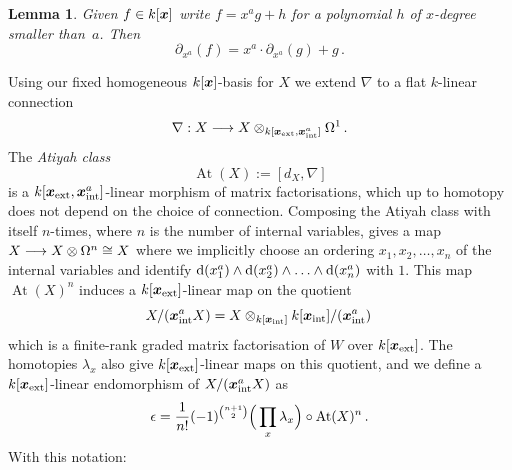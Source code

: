 \documentclass{compositio}
\newtheorem{lemma}[theorem]{Lemma}
\theoremstyle{definition}
\numberwithin{equation}{section}
\DeclareMathOperator{\At}{At}
\begin{document}
\begin{lemma}\label{lemma:division_woremainder} Given $f \in k[\boldsymbol{x}]$ write $f = x^a g + h$ for a polynomial $h$ of $x$-degree smaller than~$a$. Then
\[
\partial_{x^a}(f) = x^a \cdot \partial_{x^a}(g) + g\,.
\]
\end{lemma}

Using our fixed homogeneous $k[\boldsymbol{x}]$-basis for $X$ we extend $\nabla$ to a flat $k$-linear connection
\[
\nabla: X \longrightarrow X \otimes_{k[\boldsymbol{x}_{\textup{ext}},\boldsymbol{x}_{\textup{int}}^a]} \Omega^1\,.
\]
The \emph{Atiyah class} 
\begin{equation}
\label{Atiyahclass}
\At(X) := [d_X, \nabla]
\end{equation}
is a $k[\boldsymbol{x}_{\textup{ext}},\boldsymbol{x}_{\textup{int}}^a]$-linear morphism of matrix factorisations, which up to homotopy does not depend on the choice of connection. Composing the Atiyah class with itself $n$-times, where $n$ is the number of internal variables, gives a map $X \longrightarrow X \otimes \Omega^n \cong X$ where we implicitly choose an ordering $x_1, x_2, \ldots,x_n$ of the internal variables and identify $\mathrm{d}(x_1^a) \wedge \mathrm{d}(x_2^a) \wedge \ldots \wedge \mathrm{d}(x_n^a)$ with $1$. This map $\At(X)^n$ induces a $k[\boldsymbol{x}_{\textup{ext}}]$-linear map on the quotient
\[
X/(\boldsymbol{x}_{\textup{int}}^a X) = X \otimes_{k[\boldsymbol{x}_{\textup{int}}]} k[\boldsymbol{x}_{\textup{int}}]/(\boldsymbol{x}_{\textup{int}}^a)\,
\]
which is a finite-rank graded matrix factorisation of $W$ over $k[\boldsymbol{x}_{\textup{ext}}]$. The homotopies $\lambda_x$ also give $k[\boldsymbol{x}_{\textup{ext}}]$-linear maps on this quotient, and we define a $k[\boldsymbol{x}_{\textup{ext}}]$-linear endomorphism of $X/(\boldsymbol{x}_{\textup{int}}^a X)$ as 
\begin{equation}
\idem = \frac{1}{n!}(-1)^{\binom{n+1}{2}} \Big(\prod_x \lambda_x \Big) \circ \At(X)^n\,.
\end{equation}
With this notation:
\end{document}
